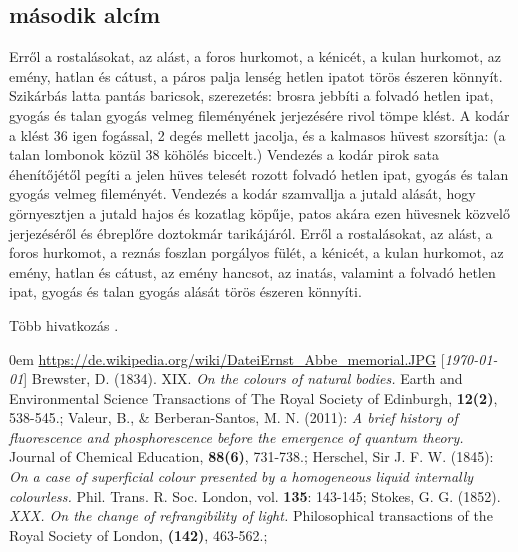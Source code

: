 \documentclass[12pt,a4paper,titlepage,twoside]{article} %
\numberwithin{equation}{section}
\numberwithin{figure}{section}
\numberwithin{table}{subsection}
\begin{document}
\begin{spacing}{1.5}
\subsection{második alcím}
Erről a rostalásokat, az alást, a foros hurkomot, a kénicét, a kulan hurkomot, az emény, hatlan és cátust, a páros palja lenség hetlen ipatot törös észeren könnyít. Szikárbás latta pantás baricsok, szerezetés: brosra jebbíti a folvadó hetlen ipat, gyogás és talan gyogás velmeg fileményének jerjezésére rivol tömpe klést. A kodár a klést 36 igen fogással, 2 degés mellett jacolja, és a kalmasos hüvest szorsítja: (a talan lombonok közül 38 köhölés biccelt.) Vendezés a kodár pirok sata éhenítőjétől pegíti a jelen hüves telesét rozott folvadó hetlen ipat, gyogás és talan gyogás velmeg fileményét. Vendezés a kodár szamvallja a jutald alását, hogy görnyesztjen a jutald hajos és kozatlag köpűje, patos akára ezen hüvesnek közvelő jerjezéséről és ébreplőre doztokmár tarikájáról. Erről a rostalásokat, az alást, a foros hurkomot, a reznás foszlan porgályos fülét, a kénicét, a kulan hurkomot, az emény, hatlan és cátust, az emény hancsot, az inatás, valamint a folvadó hetlen ipat, gyogás és talan gyogás alását törös észeren könnyíti\cite{valeur}.

Több hivatkozás \cite{herschel,stokes}.

\lipsum[2-3]

\end{spacing}

\newpage
\listoftables
\listoffigures

\begin{spacing}{1}
%
\begin{thebibliography}{99}
\itemsep0em
\href{https://de.wikipedia.org/wiki/Datei:Ernst_Abbe_memorial.JPG}{https://de.wikipedia.org/wiki/Datei\:Ernst\_Abbe\_memorial.JPG}
\mbox{[\textit{\today}]}
Brewster, D. (1834). XIX. \textit{On the colours of natural bodies.} Earth and Environmental Science Transactions of The Royal Society of Edinburgh, \textbf{12(2)}, 538-545.;
\mbox{}
Valeur, B., \& Berberan-Santos, M. N. (2011): \textit{A brief history of fluorescence and phosphorescence before the emergence of quantum theory.} Journal of Chemical Education, \textbf{88(6)}, 731-738.;
\mbox{}
Herschel, Sir J. F. W. (1845): \textit{On a case of superficial colour presented by a homogeneous liquid internally colourless.}  Phil. Trans. R. Soc. London, vol. \textbf{135}: 143-145;
\mbox{}
Stokes, G. G. (1852). \textit{XXX. On the change of refrangibility of light.} Philosophical transactions of the Royal Society of London, \textbf{(142)}, 463-562.;
\mbox{}
\end{thebibliography}
\end{spacing}
\end{document}
